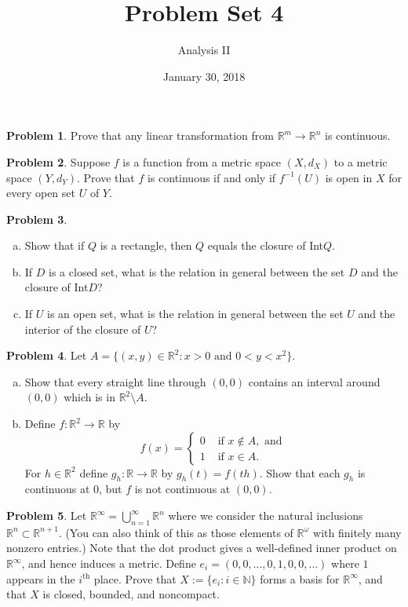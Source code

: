 \documentclass{amsart}
\newcommand{\+}[1]{\ensuremath{\mathbf{#1}}}
\newcommand{\R}{{\mathbb R}}
\theoremstyle{definition}
\newtheorem{prob}{Problem}
\begin{document}
\title{Problem Set 4}
\date{January 30, 2018}
\author{Analysis II}

\maketitle

\begin{prob}
 Prove that any linear transformation from $\R^m \to \R^n$ is continuous.
\end{prob}

\begin{prob}
Suppose $f$ is a  function from a metric space $(X,d_X)$ to a metric space $(Y,d_Y)$.
Prove that $f$ is continuous if and only if $f^{-1}(U)$ is open in $X$ for every open set $U$ of $Y$. 
\end{prob}

\begin{prob}
\begin{enumerate}[(a)]
 \item Show that if $Q$ is a rectangle, then $Q$ equals the closure
 of Int$Q$.
 \item If $D$ is a closed set, what is the relation in general between
 the set $D$ and the closure of Int$D$?
 \item If $U$ is an open set, what is the relation in general
 between the set $U$ and the interior of the closure of $U$?
\end{enumerate}
 \end{prob}

\begin{prob}
 Let $A = \{(x,y) \in \R^2: x > 0 \text{ and } 0 < y < x^2\}$.
\begin{enumerate}[(a)]
 \item Show that every straight line through $(0,0)$
 contains an interval around $(0,0)$ which is in $\R^2 \setminus A$.
 \item Define $f:\R^2 \to \R$ by
 \[
 f(x) = \begin{cases}
     0 &\text{ if } x \not\in A, \text{ and}\\
     1 &\text{ if } x \in A.
    \end{cases}
 \]
 For $h \in \R^2$ define $g_h: \R \to \R$
 by $g_h(t) = f(th)$.
 Show that each $g_h$ is continuous at $0$, but
 $f$ is not continuous at $(0,0)$.
 \end{enumerate}
 \end{prob}



\begin{prob}
 Let $\R^{\infty} = \bigcup^{\infty}_{n=1} \R^n$ where we consider the natural inclusions $\R^n \subset \R^{n+1}$.  
 (You can also think of this as those elements of $\R^\omega$ with finitely many nonzero entries.)
 Note that the dot product gives a well-defined inner product on  $\R^{\infty}$, and hence induces a metric.
 Define $e_i = (0, 0, \ldots, 0, 1, 0, 0, \ldots )$ where $1$ appears in the $i^\text{th}$ place.
 Prove that $X := \{e_i: i \in \mathbb{N}\}$ forms a basis for $\R^{\infty}$, and that $X$ is
 closed, bounded, and noncompact. 
\end{prob}
\end{document}
